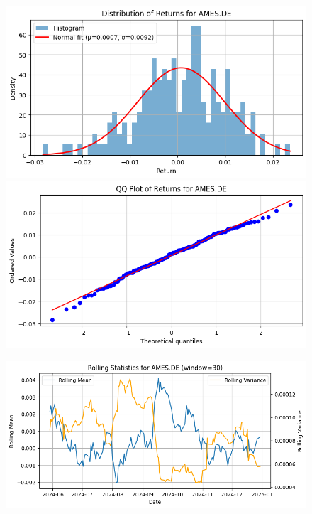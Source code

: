 \documentclass{article}%
\begin{document}
\begin{figure}[htbp]%
\begin{minipage}{0.49\textwidth}%
\includegraphics[width=\linewidth]{ticker_images/AMES.DE_return_distribution.png}%
\end{minipage}%
\begin{minipage}{0.49\textwidth}%
\includegraphics[width=\linewidth]{ticker_images/AMES.DE_qq_plot.png}%
\end{minipage}%
\end{figure}

%


\begin{figure}[htbp]%
\begin{minipage}{0.49\textwidth}%
\includegraphics[width=\linewidth]{ticker_images/AMES.DE_rolling_stats.png}%
\end{minipage}%
\end{figure}
\end{document}
